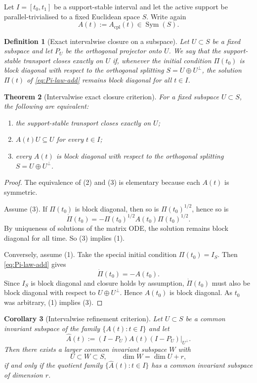 \documentclass[11pt,a4paper]{article}
\numberwithin{equation}{section}
\DeclareMathOperator{\Sym}{Sym}
\theoremstyle{thmcompact}
\newtheorem{theorem}{Theorem}[section]
\newtheorem{corollary}[theorem]{Corollary}
\newtheorem{definition}[theorem]{Definition}
\theoremstyle{remark}
\begin{document}
Let $I=[t_0,t_1]$ be a support-stable interval and let the active support be parallel-trivialised to a fixed Euclidean space $S$. Write again
\[
A(t):=A_{\mathrm{cpl}}(t)\in \Sym(S).
\]

\begin{definition}[Exact intervalwise closure on a subspace]
Let $U\subset S$ be a fixed subspace and let $P_U$ be the orthogonal projector onto $U$. We say that the support-stable transport closes exactly on $U$ if, whenever the initial condition $\Pi(t_0)$ is block diagonal with respect to the orthogonal splitting $S=U\oplus U^\perp$, the solution $\Pi(t)$ of \eqref{eq:Pi-law-add} remains block diagonal for all $t\in I$.
\end{definition}

\begin{theorem}[Intervalwise exact closure criterion]
\label{thm:interval-closure}
For a fixed subspace $U\subset S$, the following are equivalent:
\begin{enumerate}
\item the support-stable transport closes exactly on $U$;
\item $A(t)U\subseteq U$ for every $t\in I$;
\item every $A(t)$ is block diagonal with respect to the orthogonal splitting $S=U\oplus U^\perp$.
\end{enumerate}
\end{theorem}

\begin{proof}
The equivalence of (2) and (3) is elementary because each $A(t)$ is symmetric.

Assume (3). If $\Pi(t_0)$ is block diagonal, then so is $\Pi(t_0)^{1/2}$, hence so is
\[
\dot\Pi(t_0)=-\Pi(t_0)^{1/2}A(t_0)\Pi(t_0)^{1/2}.
\]
By uniqueness of solutions of the matrix ODE, the solution remains block diagonal for all time. So (3) implies (1).

Conversely, assume (1). Take the special initial condition $\Pi(t_0)=I_S$. Then \eqref{eq:Pi-law-add} gives
\[
\dot\Pi(t_0)=-A(t_0).
\]
Since $I_S$ is block diagonal and closure holds by assumption, $\dot\Pi(t_0)$ must also be block diagonal with respect to $U\oplus U^\perp$. Hence $A(t_0)$ is block diagonal. As $t_0$ was arbitrary, (1) implies (3).
\end{proof}

\begin{corollary}[Intervalwise refinement criterion]
\label{cor:interval-refinement}
Let $U\subset S$ be a common invariant subspace of the family $\{A(t):t\in I\}$ and let
\[
\widehat A(t):=(I-P_U)A(t)(I-P_U)\big|_{U^\perp}.
\]
Then there exists a larger common invariant subspace $W$ with
\[
U\subset W\subset S,
\qquad
\dim W=\dim U+r,
\]
if and only if the quotient family $\{\widehat A(t):t\in I\}$ has a common invariant subspace of dimension $r$.
\end{corollary}
\end{document}
